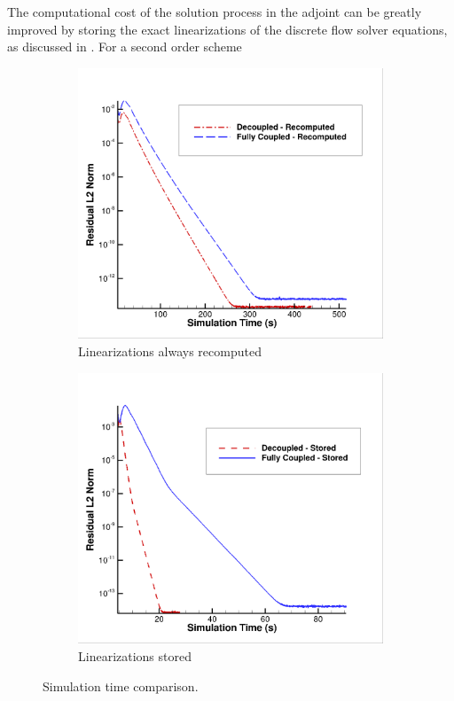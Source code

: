 The computational cost of the solution process in the adjoint can be greatly
improved by storing the exact linearizations of the discrete flow solver
equations, as discussed in .  For a second order
scheme 
\begin{figure}[h]
	\begin{subfigure}[b]{0.45\textwidth}
    \centering
    \includegraphics[width=\textwidth]{figures/adj-efficiency/adj-recompute.png}
    \caption{Linearizations always recomputed}
    \label{fig:always-recompute}
  \end{subfigure}
	\begin{subfigure}[b]{0.45\textwidth}
    \centering
    \includegraphics[width=\textwidth]{figures/adj-efficiency/adj-stored.png}
    \caption{Linearizations stored}
    \label{fig:stored}
  \end{subfigure}
  \caption{Simulation time comparison.}
  \label{fig:sim-time-comp}
\end{figure}
